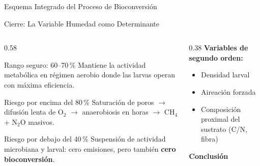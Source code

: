 \documentclass[aspectratio=169, 11pt]{beamer}
\begin{document}
\begin{frame}{Esquema Integrado del Proceso de Bioconversión}
\begin{center}
\end{center}
\end{frame}

\begin{frame}{Cierre: La Variable Humedad como Determinante}
\begin{columns}[T]
\begin{column}{0.58\textwidth}
\begin{block}{Rango seguro: 60--70\,\%}
Mantiene la actividad metabólica en régimen aerobio donde las larvas operan con máxima eficiencia.
\end{block}
\vspace{0.2cm}
\begin{alertblock}{Riesgo por encima del 80\,\%}
Saturación de poros $\rightarrow$ difusión lenta de O$_2$ $\rightarrow$ anaerobiosis en horas $\rightarrow$ CH$_4$ + N$_2$O masivos.
\end{alertblock}
\vspace{0.2cm}
\begin{block}{Riesgo por debajo del 40\,\%}
Suspensión de actividad microbiana y larval: cero emisiones, pero también \textbf{cero bioconversión}.
\end{block}
\end{column}
\begin{column}{0.38\textwidth}
\textbf{Variables de segundo orden:}
\begin{itemize}
    \item Densidad larval
    \item Aireación forzada
    \item Composición proximal del sustrato (C/N, fibra)
\end{itemize}
\vfill
\begin{center}
\textcolor{unalRojo}{\textbf{Conclusión}}
\end{center}
\end{column}
\end{columns}
\end{frame}
\end{document}

